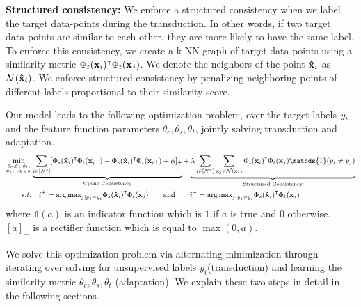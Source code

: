 \textbf{Structured consistency:} We enforce a structured consistency when we label the target data-points during the transduction. In other words, if two target data-points are similar to each other, they are more likely to have the same label. To enforce this consistency, we create a k-NN graph of target data points using a similarity metric $\Phi_t(\mathbf{x}_i)^\intercal \Phi_t(\mathbf{x}_j)$. We denote the neighbors of the point $\mathbf{\hat{x}}_i$ as $\mathcal{N}(\mathbf{\hat{x}}_i)$. We enforce structured consistency by penalizing neighboring points of different labels proportional to their similarity score. 

Our model leads to the following optimization problem, over the target labels $y_i$ and the feature function parameters $\theta_c, \theta_s, \theta_t$, jointly solving transduction and adaptation. 
\begin{equation}
\small
\begin{aligned}
\min_{\substack{\theta_c,\theta_s,\theta_t, \\ y_1, \ldots y_{N^u}}} &\underbrace{\sum_{i \in [N^s]} [\Phi_s(\xsi)^\intercal \Phi_t(\mathbf{x}_{i^-}) -\Phi_s(\xsi)^\intercal \Phi_t(\mathbf{x}_{i^+}) + \alpha]_{+}}_{\text{Cyclic Consistency}}  +\underbrace{\lambda \sum_{i \in [N^u]} \sum_{\xuj \in \mathcal{N}(\xui)}  \Phi_t(\xui)^\intercal \Phi_t(\xuj) \mathds{1}(y_i \neq y_j)}_{\text{Structured Consistency}}\\
s.t. &\quad i^{+} = {\arg\max}_{j | y_j = \hat{y}_i} \Phi_s(\xsi)^\intercal \Phi_t(\xuj) \quad \quad \text{and} \quad \quad  i^{-} = {\arg\max}_{j | y_j \neq \hat{y}_i}  \Phi_s(\xsi)^\intercal \Phi_t(\xuj)
\end{aligned}
\label{loss}
\end{equation}
where $\mathds{1}(a)$ is an indicator function which is $1$ if $a$ is true and $0$ otherwise. $[a]_+$ is a rectifier function which is equal to $\max(0, a)$.


We solve this optimization problem via alternating minimization through iterating over solving for unsupervised labels $y_i$(transduction) and learning the similarity metric $\theta_c,\theta_s,\theta_t$ (adaptation). We explain these two steps in detail in the following sections.




